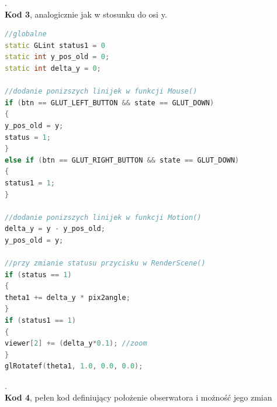 \documentclass[a4paper,11pt]{article}
\begin{document}
.\\
\textbf{Kod 3}, analogicznie jak w stosunku do osi y.   
{\small
\begin{lstlisting}[language=C++]
//globalne
static GLint status1 = 0
static int y_pos_old = 0;      
static int delta_y = 0;

//dodanie ponizszych linijek w funkcji Mouse()
if (btn == GLUT_LEFT_BUTTON && state == GLUT_DOWN)
{
y_pos_old = y;
status = 1;
}
else if (btn == GLUT_RIGHT_BUTTON && state == GLUT_DOWN)
{
status1 = 1;
}

//dodanie ponizszych linijek w funkcji Motion()
delta_y = y - y_pos_old;
y_pos_old = y;

//przy zmianie statusu przycisku w RenderScene()
if (status == 1)              
{
theta1 += delta_y * pix2angle;
}
if (status1 == 1)  
{
viewer[2] += (delta_y*0.1); //zoom
}
glRotatef(theta1, 1.0, 0.0, 0.0);
\end{lstlisting}
}
.\\
\textbf{Kod 4}, pełen kod definiujący położenie obserwatora i możność jego zmian
\end{document}
